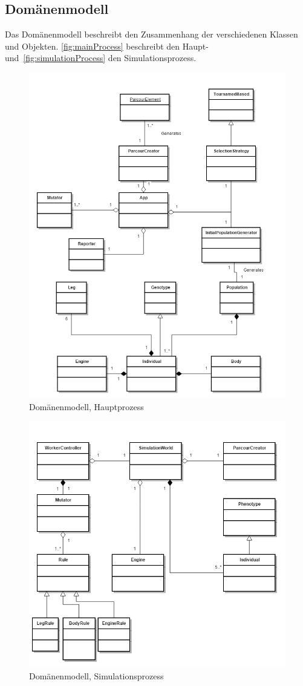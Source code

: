     \subsection{Domänenmodell\label{sub:domMod}}

      Das Domänenmodell beschreibt den Zusammenhang der verschiedenen Klassen und Objekten.
      \vref{fig:mainProcess} beschreibt den Haupt- und~\vref{fig:simulationProcess} den Simulationsprozess.
      \begin{figure}[H]
        \includegraphics[scale=0.6,center]{graphics/main_process}
        \caption{Domänenmodell, Hauptprozess\label{fig:mainProcess}}
      \end{figure}
      \begin{figure}[H]
        \includegraphics[scale=0.6,center]{graphics/simulation_process}
        \caption{Domänenmodell, Simulationsprozess\label{fig:simulationProcess}}
      \end{figure}

